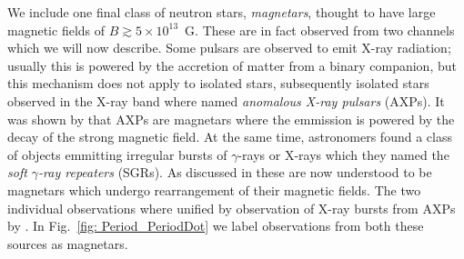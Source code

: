 We include one final class of neutron stars, \emph{magnetars}, thought to have
large magnetic fields of $B\gtrsim 5\times10^{13}$~G. These are in fact
observed from two channels which we will now describe. Some pulsars are
observed to emit X-ray radiation; usually this is powered by the accretion of
matter from a binary companion, but this mechanism does not apply to isolated
stars, subsequently isolated stars observed in the X-ray band where named
\emph{anomalous X-ray pulsars} (AXPs). It was shown by
\citet{duncan1996magnetars} that AXPs are magnetars where the emmission is
powered by the decay of the strong magnetic field.  At the same time,
astronomers found a class of objects emmitting irregular bursts of
$\gamma$-rays or X-rays which they named the \emph{soft $\gamma$-ray repeaters}
(SGRs). As discussed in \citet{kouveliotou2003magnetars} these are now
understood to be magnetars which undergo rearrangement of their magnetic
fields. The two individual observations where unified by observation of X-ray
bursts from AXPs by \citet{Gavriil2002}. In Fig.~\ref{fig: Period_PeriodDot} we
label observations from both these sources as magnetars.
